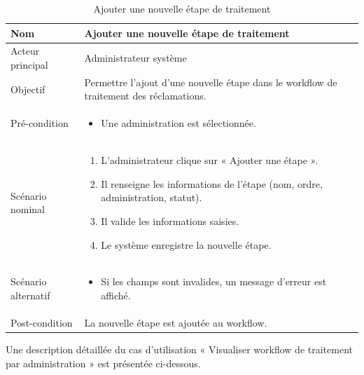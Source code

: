 \begin{table}[H]
\centering
\begin{tabular}{ |p{4cm}|p{12cm}|} \hline

Nom & Ajouter une nouvelle étape de traitement \\ \hline

Acteur principal & Administrateur système \\ \hline

Objectif & Permettre l’ajout d’une nouvelle étape dans le workflow de traitement des réclamations. \\ \hline

Pré-condition &
\begin{itemize}
    \item Une administration est sélectionnée.
\end{itemize}
\\ \hline

Scénario nominal &
\begin{enumerate}
    \item L’administrateur clique sur « Ajouter une étape ».
    \item Il renseigne les informations de l’étape (nom, ordre, administration, statut).
    \item Il valide les informations saisies.
    \item Le système enregistre la nouvelle étape.
\end{enumerate}
\\ \hline

Scénario alternatif &
\begin{itemize}
    \item Si les champs sont invalides, un message d’erreur est affiché.
\end{itemize}
\\ \hline

Post-condition &
La nouvelle étape est ajoutée au workflow. \\ \hline

\end{tabular}
\caption{Ajouter une nouvelle étape de traitement}
\end{table}


Une description détaillée du cas d’utilisation « Visualiser workflow de traitement par administration » est présentée ci-dessous.

